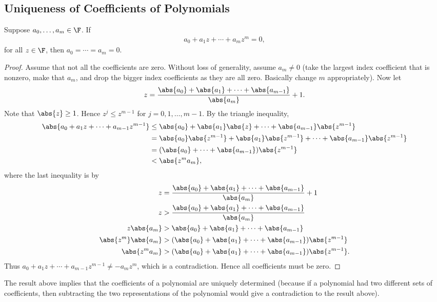 \documentclass{article}
\begin{document}
\subsection{Uniqueness of Coefficients of Polynomials}
\begin{prop}\label{prop:zero_polynomial}
  Suppose $a_0, \dots, a_m \in \F$. If
  \begin{align*}
    a_0 + a_1z + \cdots + a_mz^m = 0,
  \end{align*}
  for all $z \in \F$, then $a_0 = \cdots = a_m = 0$.
\end{prop}
\begin{proof}
  Assume that not all the coefficients are zero. Without loss of generality, assume $a_m \neq 0$ (take the largest index coefficient that is nonzero, make that $a_m$, and drop the bigger
  index coefficients as they are all zero. Basically change $m$ appropriately). Now let 
  \begin{align*}
    z = \frac{\abs{a_0} + \abs{a_1} + \cdots + \abs{a_{m - 1}}}{\abs{a_m}} + 1.
  \end{align*}
  Note that $\abs{z} \geq 1$. Hence $z^j \leq z^{m - 1}$ for $j = 0, 1, \dots, m - 1$. By the triangle inequality,
  \begin{align*}
    \abs{a_0 + a_1z + \cdots + a_{m - 1}z^{m - 1}} & \leq \abs{a_0} + \abs{a_1}\abs{z} + \cdots + \abs{a_{m - 1}}\abs{z^{m - 1}} \\
    & = \abs{a_0}\abs{z^{m - 1}} + \abs{a_1}\abs{z^{m - 1}} + \cdots + \abs{a_{m - 1}}\abs{z^{m - 1}} \\
    & = (\abs{a_0} + \cdots + \abs{a_{m - 1}})\abs{z^{m - 1}} \\
    & < \abs{z^ma_m},
  \end{align*}
  where the last inequality is by
  \begin{align*}
    z & = \frac{\abs{a_0} + \abs{a_1} + \cdots + \abs{a_{m - 1}}}{\abs{a_m}} + 1 \\
    z & > \frac{\abs{a_0} + \abs{a_1} + \cdots + \abs{a_{m - 1}}}{\abs{a_m}} \\
    z\abs{a_m} & > \abs{a_0} + \abs{a_1} + \cdots + \abs{a_{m - 1}} \\
    \abs{z^{m}}\abs{a_m} & > (\abs{a_0} + \abs{a_1} + \cdots + \abs{a_{m - 1}})\abs{z^{m - 1}} \\
    \abs{z^{m}a_m} & > (\abs{a_0} + \abs{a_1} + \cdots + \abs{a_{m - 1}})\abs{z^{m - 1}}. \\
  \end{align*}
  Thus $a_0 + a_1z + \cdots + a_{m - 1}z^{m - 1} \neq -a_mz^{m}$, which is a contradiction. Hence all coefficients must be zero.
\end{proof}
The result above implies that the coefficients of a polynomial are uniquely determined (because if a polynomial had two different sets of coefficients, then subtracting the two
representations of the polynomial would give a contradiction to the result above). 
\end{document}
